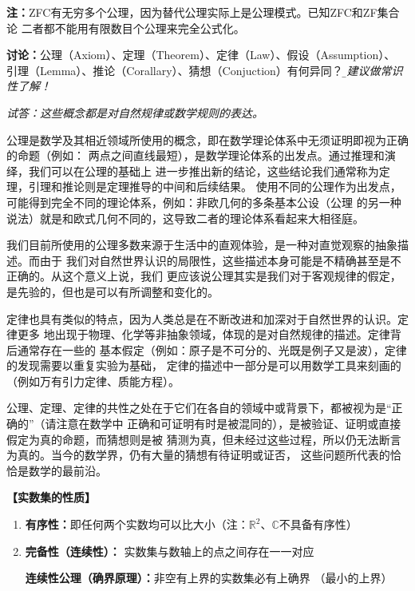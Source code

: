 \begin{shaded}
	{\bf 注：}ZFC有无穷多个公理，因为替代公理实际上是公理模式。已知ZFC和ZF集合论
	二者都不能用有限数目个公理来完全公式化。
	
	{\bf 讨论：}公理（Axiom）、定理（Theorem）、定律（Law）、假设（Assumption）、
	引理（Lemma）、推论（Corallary）、猜想（Conjuction）有何异同？
	{\b\dotfill\it 建议做常识性了解！}
	
	{\it 试答：这些概念都是对自然规律或数学规则的表达。
	
	公理是数学及其相近领域所使用的概念，即在数学理论体系中无须证明即视为正确的命题（例如：
	两点之间直线最短），是数学理论体系的出发点。通过推理和演绎，我们可以在公理的基础上
	进一步推出新的结论，这些结论我们通常称为定理，引理和推论则是定理推导的中间和后续结果。
	使用不同的公理作为出发点，可能得到完全不同的理论体系，例如：非欧几何的多条基本公设（公理
	的另一种说法）就是和欧式几何不同的，这导致二者的理论体系看起来大相径庭。
	
	我们目前所使用的公理多数来源于生活中的直观体验，是一种对直觉观察的抽象描述。而由于
	我们对自然世界认识的局限性，这些描述本身可能是不精确甚至是不正确的。从这个意义上说，我们
	更应该说公理其实是我们对于客观规律的假定，是先验的，但也是可以有所调整和变化的。
	
	定律也具有类似的特点，因为人类总是在不断改进和加深对于自然世界的认识。定律更多
	地出现于物理、化学等非抽象领域，体现的是对自然规律的描述。定律背后通常存在一些的
	基本假定（例如：原子是不可分的、光既是例子又是波），定律的发现需要以重复实验为基础，
	定律的描述中一部分是可以用数学工具来刻画的（例如万有引力定律、质能方程）。
	
	公理、定理、定律的共性之处在于它们在各自的领域中或背景下，都被视为是“正确的”（请注意在数学中
	正确和可证明有时是被混同的），是被验证、证明或直接假定为真的命题，而猜想则是被
	猜测为真，但未经过这些过程，所以仍无法断言为真的。当今的数学界，仍有大量的猜想有待证明或证否，
	这些问题所代表的恰恰是数学的最前沿。
	}
\end{shaded}
	
{\bf 【实数集的性质】}
	\begin{thx}
		\begin{enumerate} 
		  \item {\bf 有序性：}即任何两个实数均可以比大小\quad （注：$\mathbb{R}^2$、$\mathbb{C}$不具备有序性） 
		  \item {\bf 完备性（连续性）： }实数集与数轴上的点之间存在一一对应
			
		  {\bf{连续性公理（确界原理）：}}非空有{上界}的实数集必有{上确界} （最小的上界）
		\end{enumerate}
	\end{thx}
	
